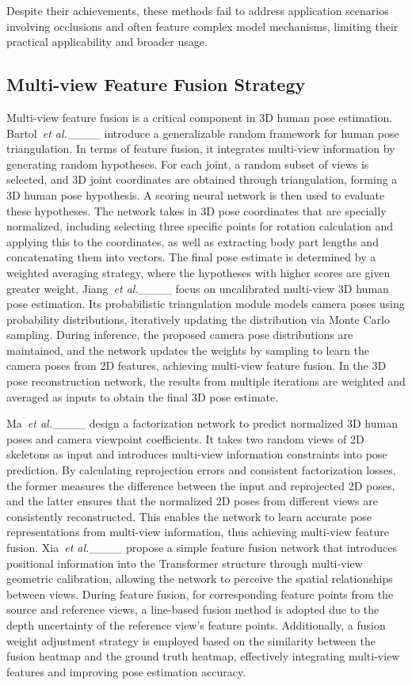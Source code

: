 Despite their achievements, these methods fail to address application scenarios involving occlusions and often feature complex model mechanisms, limiting their practical applicability and broader usage.

\subsection{Multi-view Feature Fusion Strategy}
Multi-view feature fusion is a critical component in 3D human pose estimation. Bartol~\textit{et al.}____ introduce a generalizable random framework for human pose triangulation. In terms of feature fusion, it integrates multi-view information by generating random hypotheses. 
For each joint, a random subset of views is selected, and 3D joint coordinates are obtained through triangulation, forming a 3D human pose hypothesis. A scoring neural network is then used to evaluate these hypotheses. 
The network takes in 3D pose coordinates that are specially normalized, including selecting three specific points for rotation calculation and applying this to the coordinates, as well as extracting body part lengths and concatenating them into vectors. 
The final pose estimate is determined by a weighted averaging strategy, where the hypotheses with higher scores are given greater weight. 
Jiang~\textit{et al.}____ focus on uncalibrated multi-view 3D human pose estimation. 
Its probabilistic triangulation module models camera poses using probability distributions, iteratively updating the distribution via Monte Carlo sampling. During inference, the proposed camera pose distributions are maintained, and the network updates the weights by sampling to learn the camera poses from 2D features, achieving multi-view feature fusion. 
In the 3D pose reconstruction network, the results from multiple iterations are weighted and averaged as inputs to obtain the final 3D pose estimate. 

Ma~\textit{et al.}____ design a factorization network to predict normalized 3D human poses and camera viewpoint coefficients. 
It takes two random views of 2D skeletons as input and introduces multi-view information constraints into pose prediction. 
By calculating reprojection errors and consistent factorization losses, the former measures the difference between the input and reprojected 2D poses, and the latter ensures that the normalized 2D poses from different views are consistently reconstructed. 
This enables the network to learn accurate pose representations from multi-view information, thus achieving multi-view feature fusion. 
Xia~\textit{et al.}____ propose a simple feature fusion network that introduces positional information into the Transformer structure through multi-view geometric calibration, allowing the network to perceive the spatial relationships between views. 
During feature fusion, for corresponding feature points from the source and reference views, a line-based fusion method is adopted due to the depth uncertainty of the reference view’s feature points. Additionally, a fusion weight adjustment strategy is employed based on the similarity between the fusion heatmap and the ground truth heatmap, effectively integrating multi-view features and improving pose estimation accuracy.

